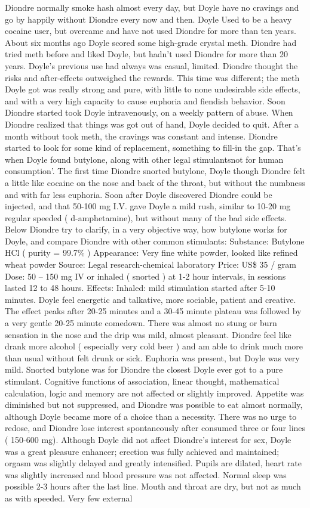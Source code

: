 \documentclass[12pt]{book}
\begin{document}
Diondre normally smoke hash almost every day, but Doyle have no cravings and go by happily without Diondre every now and then. Doyle Used to be a heavy cocaine user, but overcame and have not used Diondre for more than ten years. About six months ago Doyle scored some high-grade crystal meth. Diondre had tried meth before and liked Doyle, but hadn't used Diondre for more than 20 years. Doyle's previous use had always was casual, limited. Diondre thought the risks and after-effects outweighed the rewards. This time was different; the meth Doyle got was really strong and pure, with little to none undesirable side effects, and with a very high capacity to cause euphoria and fiendish behavior. Soon Diondre started took Doyle intravenously, on a weekly pattern of abuse. When Diondre realized that things was got out of hand, Doyle decided to quit. After a month without took meth, the cravings was constant and intense. Diondre started to look for some kind of replacement, something to fill-in the gap. That's when Doyle found butylone, along with other legal stimulantsnot for human consumption'. The first time Diondre snorted butylone, Doyle though Diondre felt a little like cocaine on the nose and back of the throat, but without the numbness and with far less euphoria. Soon after Doyle discovered Diondre could be injected, and that 50-100 mg I.V. gave Doyle a mild rush, similar to 10-20 mg regular speeded ( d-amphetamine), but without many of the bad side effects. Below Diondre try to clarify, in a very objective way, how butylone works for Doyle, and compare Diondre with other common stimulants: Substance: Butylone HCl ( purity = 99.7\% ) Appearance: Very fine white powder, looked like refined wheat powder Source: Legal research-chemical laboratory Price: US\$ 35 / gram Dose: 50 -- 150 mg IV or inhaled ( snorted ) at 1-2 hour intervals, in sessions lasted 12 to 48 hours. Effects: Inhaled: mild stimulation started after 5-10 minutes. Doyle feel energetic and talkative, more sociable, patient and creative. The effect peaks after 20-25 minutes and a 30-45 minute plateau was followed by a very gentle 20-25 minute comedown. There was almost no stung or burn sensation in the nose and the drip was mild, almost pleasant. Diondre feel like drank more alcohol ( especially very cold beer ) and am able to drink much more than usual without felt drunk or sick. Euphoria was present, but Doyle was very mild. Snorted butylone was for Diondre the closest Doyle ever got to a pure stimulant. Cognitive functions of association, linear thought, mathematical calculation, logic and memory are not affected or slightly improved. Appetite was diminished but not suppressed, and Diondre was possible to eat almost normally, although Doyle became more of a choice than a necessity. There was no urge to redose, and Diondre lose interest spontaneously after consumed three or four lines ( 150-600 mg). Although Doyle did not affect Diondre's interest for sex, Doyle was a great pleasure enhancer; erection was fully achieved and maintained; orgasm was slightly delayed and greatly intensified. Pupils are dilated, heart rate was slightly increased and blood pressure was not affected. Normal sleep was possible 2-3 hours after the last line. Mouth and throat are dry, but not as much as with speeded. Very few external 
\end{document}
